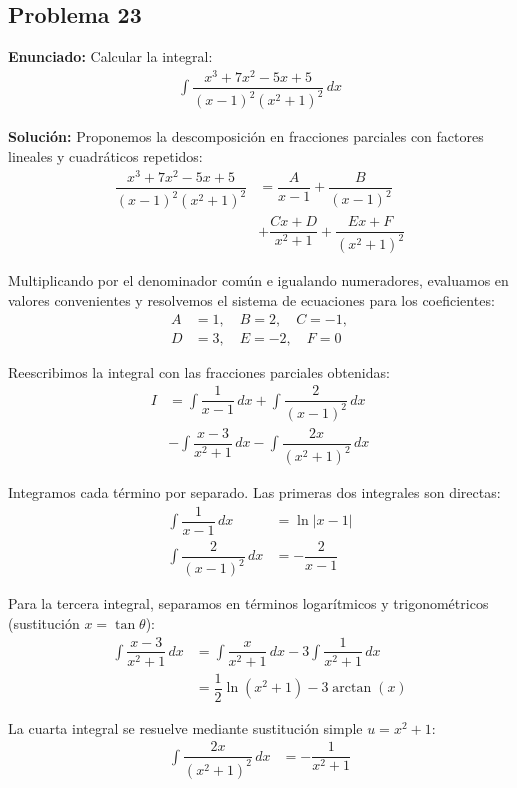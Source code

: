 \subsection*{Problema 23}

\textbf{Enunciado:} Calcular la integral:
\begin{align*}
\int \dfrac{x^3 + 7x^2 - 5x + 5}{(x - 1)^2 (x^2 + 1)^2} \, dx
\end{align*}

\textbf{Solución:} Proponemos la descomposición en fracciones parciales con factores lineales y cuadráticos repetidos:
\begin{align*}
\dfrac{x^3 + 7x^2 - 5x + 5}{(x - 1)^2 (x^2 + 1)^2} &= \dfrac{A}{x-1} + \dfrac{B}{(x-1)^2} \\
&+ \dfrac{Cx+D}{x^2+1} + \dfrac{Ex+F}{(x^2+1)^2}
\end{align*}

Multiplicando por el denominador común e igualando numeradores, evaluamos en valores convenientes y resolvemos el sistema de ecuaciones para los coeficientes:
\begin{align*}
A &= 1, \quad B = 2, \quad C = -1, \\
D &= 3, \quad E = -2, \quad F = 0
\end{align*}

Reescribimos la integral con las fracciones parciales obtenidas:
\begin{align*}
I &= \int \dfrac{1}{x-1} \, dx + \int \dfrac{2}{(x-1)^2} \, dx \\
&- \int \dfrac{x-3}{x^2+1} \, dx - \int \dfrac{2x}{(x^2+1)^2} \, dx
\end{align*}

Integramos cada término por separado. Las primeras dos integrales son directas:
\begin{align*}
\int \dfrac{1}{x-1} \, dx &= \ln|x-1| \\
\int \dfrac{2}{(x-1)^2} \, dx &= -\dfrac{2}{x-1}
\end{align*}

Para la tercera integral, separamos en términos logarítmicos y trigonométricos (sustitución $x = \tan\theta$):
\begin{align*}
\int \dfrac{x-3}{x^2+1} \, dx &= \int \dfrac{x}{x^2+1} \, dx - 3\int \dfrac{1}{x^2+1} \, dx \\
&= \dfrac{1}{2}\ln(x^2+1) - 3\arctan(x)
\end{align*}

La cuarta integral se resuelve mediante sustitución simple $u = x^2+1$:
\begin{align*}
\int \dfrac{2x}{(x^2+1)^2} \, dx &= -\dfrac{1}{x^2+1}
\end{align*}

